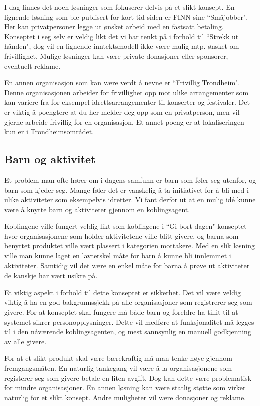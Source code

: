 I dag finnes det noen løsninger som fokuserer delvis på et slikt konsept. En lignende løsning som ble publisert for kort tid siden er FINN sine ``Småjobber". Her kan privatpersoner legge ut ønsket arbeid med en fastsatt betaling. Konseptet i seg selv er veldig likt det vi har tenkt på i forhold til ``Strekk ut hånden", dog vil en lignende inntektsmodell ikke være mulig mtp. ønsket om frivillighet. Mulige løsninger kan være private donasjoner eller sponsorer, eventuelt reklame.

En annen organisasjon som kan være verdt å nevne er ``Frivillig Trondheim". Denne organisasjonen arbeider for frivillighet opp mot ulike arrangementer som kan variere fra for eksempel idrettsarrangementer til konserter og festivaler. Det er viktig å poengtere at du her melder deg opp som en privatperson, men vil gjerne arbeide frivillig for en organisasjon. Et annet poeng er at lokaliseringen kun er i Trondheimsområdet.

\subsection{Barn og aktivitet}
\label{sec:barnaktivitet}
Et problem man ofte hører om i dagens samfunn er barn som føler seg utenfor, og barn som kjeder seg. Mange føler det er vanskelig å ta initiativet for å bli med i ulike aktiviteter som eksempelvis idretter. Vi fant derfor ut at en mulig idé kunne være å knytte barn og aktiviteter gjennom en koblingsagent.

Koblingene ville fungert veldig likt som koblingene i ``Gi bort dagen"-konseptet hvor organisasjonene som holder aktivitetene ville blitt givere, og barna som benyttet produktet ville vært plassert i kategorien mottakere. Med en slik løsning ville man kunne laget en lavterskel måte for barn å kunne bli innlemmet i aktiviteter. Samtidig vil det være en enkel måte for barna å prøve ut aktiviteter de kanskje har vært usikre på.

Et viktig aspekt i forhold til dette konseptet er sikkerhet. Det vil være veldig viktig å ha en god bakgrunnssjekk på alle organisasjoner som registrerer seg som givere. For at konseptet skal fungere må både barn og foreldre ha tillit til at systemet sikrer personopplysninger. Dette vil medføre at funksjonalitet må legges til i den nåværende koblingsagenten, og mest sannsynlig en manuell godkjenning av alle givere.

For at et slikt produkt skal være bærekraftig må man tenke nøye gjennom fremgangsmåten. En naturlig tankegang vil være å la organisasjonene som registerer seg som givere betale en liten avgift. Dog kan dette være problematisk for mindre organisasjoner. En annen løsning kan være statlig støtte som virker naturlig for et slikt konsept. Andre muligheter vil være donasjoner og reklame.

